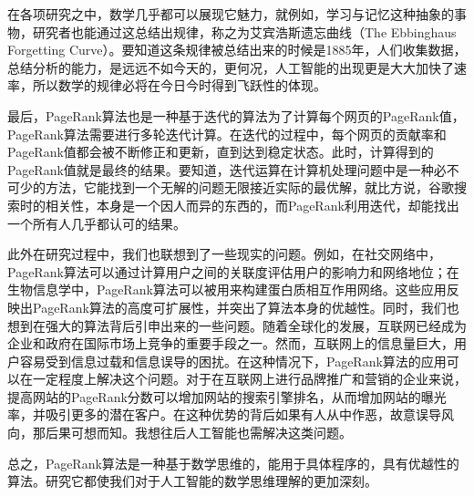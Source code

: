 \documentclass[UTF8,openany]{ctexbook}
\begin{document}
在各项研究之中，数学几乎都可以展现它魅力，就例如，学习与记忆这种抽象的事物，研究者也能通过这总结出规律，称之为艾宾浩斯遗忘曲线（The Ebbinghaus Forgetting Curve）。要知道这条规律被总结出来的时候是1885年，人们收集数据，总结分析的能力，是远远不如今天的，更何况，人工智能的出现更是大大加快了速率，所以数学的规律必将在今日今时得到飞跃性的体现。

最后，PageRank算法也是一种基于迭代的算法为了计算每个网页的PageRank值，PageRank算法需要进行多轮迭代计算。在迭代的过程中，每个网页的贡献率和PageRank值都会被不断修正和更新，直到达到稳定状态。此时，计算得到的PageRank值就是最终的结果。要知道，迭代运算在计算机处理问题中是一种必不可少的方法，它能找到一个无解的问题无限接近实际的最优解，就比方说，谷歌搜索时的相关性，本身是一个因人而异的东西的，而PageRank利用迭代，却能找出一个所有人几乎都认可的结果。

此外在研究过程中，我们也联想到了一些现实的问题。例如，在社交网络中，PageRank算法可以通过计算用户之间的关联度评估用户的影响力和网络地位；在生物信息学中，PageRank算法可以被用来构建蛋白质相互作用网络。这些应用反映出PageRank算法的高度可扩展性，并突出了算法本身的优越性。同时，我们也想到在强大的算法背后引申出来的一些问题。随着全球化的发展，互联网已经成为企业和政府在国际市场上竞争的重要手段之一。然而，互联网上的信息量巨大，用户容易受到信息过载和信息误导的困扰。在这种情况下，PageRank算法的应用可以在一定程度上解决这个问题。对于在互联网上进行品牌推广和营销的企业来说，提高网站的PageRank分数可以增加网站的搜索引擎排名，从而增加网站的曝光率，并吸引更多的潜在客户。在这种优势的背后如果有人从中作恶，故意误导风向，那后果可想而知。我想往后人工智能也需解决这类问题。

总之，PageRank算法是一种基于数学思维的，能用于具体程序的，具有优越性的算法。研究它都使我们对于人工智能的数学思维理解的更加深刻。
\end{document}
